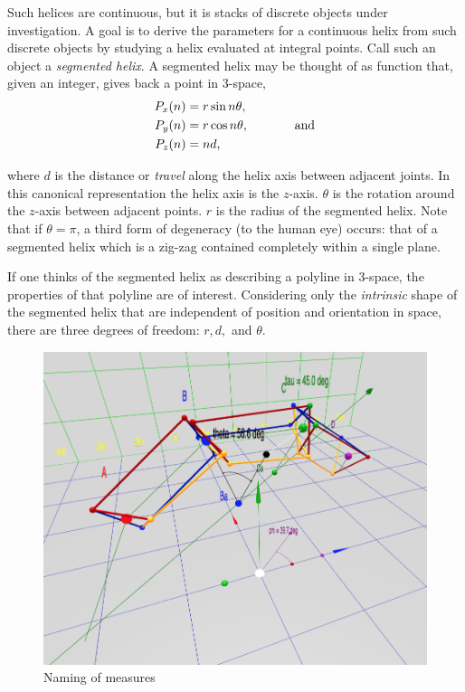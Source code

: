 \documentclass[mathematics,article,submit,pdftex,moreauthors]{Definitions/mdpi}
\begin{document}
Such helices are continuous, but it is stacks of discrete objects under investigation.
A goal is to derive
the parameters for a continuous helix from such discrete objects by studying
a helix evaluated at integral points. Call such an object a {\em segmented helix}.
A segmented helix may be thought of as function that, given an integer, gives back a point in
3-space,
\begin{align}
    P_x(n) &= r \sin{n \theta},  \\
    P_y(n) &= r \cos{n \theta}, \text{ \hspace{3em} and}\\
   P_z(n) &= n d,
\end{align}

where $d$ is the distance or {\em travel} along the helix axis between adjacent joints. In this canonical representation the helix axis is
the $z$-axis.
$\theta$ is the rotation around the $z$-axis
between adjacent points.
$r$ is the radius of the segmented helix.
Note that if $\theta = \pi$, a third form of degeneracy (to the human eye) occurs:
that of a segmented helix
which is a zig-zag contained completely within a single plane.

If one thinks of the segmented helix as describing a polyline in 3-space,
the properties of that polyline are of interest.
Considering only the {\em intrinsic} shape of the segmented helix that
are independent of position and orientation in space,
there are three degrees
of freedom: $r,d,$ and $\theta$.

\begin{figure}
  \centering
  \captionsetup{justification=centering}
     \includegraphics[width=10 cm]{figures/ABCDFigure.png}
     \caption{Naming of measures}
  \label{fig:naming}
\end{figure}
\unskip
\end{document}
